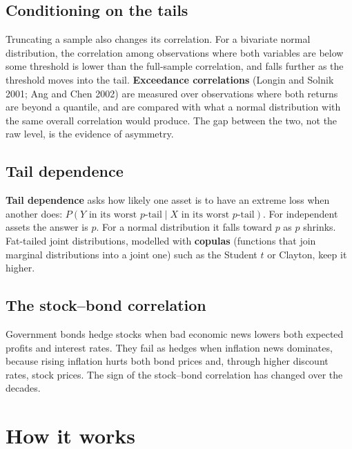 \subsection{Conditioning on the tails}

Truncating a sample also changes its correlation. For a bivariate normal distribution, the correlation among observations where both variables are below some threshold is lower than the full-sample correlation, and falls further as the threshold moves into the tail. \textbf{Exceedance correlations} (Longin and Solnik 2001; Ang and Chen 2002) are measured over observations where both returns are beyond a quantile, and are compared with what a normal distribution with the same overall correlation would produce. The gap between the two, not the raw level, is the evidence of asymmetry.

\subsection{Tail dependence}

\textbf{Tail dependence} asks how likely one asset is to have an extreme loss when another does: $P(Y \text{ in its worst } p\text{-tail} \mid X \text{ in its worst } p\text{-tail})$. For independent assets the answer is $p$. For a normal distribution it falls toward $p$ as $p$ shrinks. Fat-tailed joint distributions, modelled with \textbf{copulas} (functions that join marginal distributions into a joint one) such as the Student $t$ or Clayton, keep it higher.

\subsection{The stock--bond correlation}

Government bonds hedge stocks when bad economic news lowers both expected profits and interest rates. They fail as hedges when inflation news dominates, because rising inflation hurts both bond prices and, through higher discount rates, stock prices. The sign of the stock--bond correlation has changed over the decades.

\section{How it works}
\label{sec:13-how}

